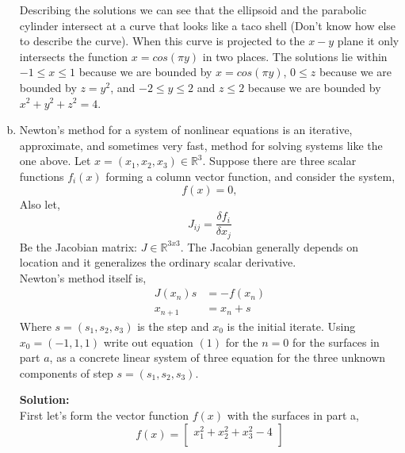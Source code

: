 \documentclass[12pt]{article}
\makeatletter
\theoremstyle{homework}
\newenvironment{exercise}[1]
{\def\@currentlabel{#1}\exercisecore}
{\endexercisecore}
\newcommand{\localhead}[1]{\par\smallskip\noindent\textbf{#1}\nobreak\\}%
\newcommand\solution{\localhead{Solution:}}
\newcommand{\Reals}{\ensuremath{\mathbb R}}
\let\RR\Reals
\makeatother
\begin{document}
\begin{exercise}{P5}
\begin{enumerate}[a.]
          \begin{center}
            
          \end{center}
          Describing the solutions we can see that the ellipsoid and the parabolic cylinder intersect at a curve that looks like a taco shell (Don't know how else to describe the curve).
          When this curve is projected to the $x-y$ plane it only intersects the function $x = cos(\pi y)$ in two places. The solutions lie within $-1\leq x \leq 1$ because we are bounded by $x = cos(\pi y)$,
          $0\leq z$ because we are bounded by $z = y^2$, and $-2\leq y \leq 2$ and $z \leq 2$ because we are bounded by $x^2 + y^2 + z^2 = 4$.
          \vspace{.15in}

    \item Newton's method for a system of nonlinear equations is an iterative, approximate, and sometimes very fast, method for solving systems like the one above. Let $x =(x_1, x_2,x_3) \in \RR^3$.
          Suppose there are three scalar functions $f_i(x)$ forming a column vector function, and consider the system,
          \begin{equation*}
            f(x) = 0,
          \end{equation*}
          Also let,
          \begin{equation*}
            J_{ij} = \dfrac{\delta f_i}{\delta x_j}
          \end{equation*}
          Be the Jacobian matrix: $J \in \RR^{3x3}$. The Jacobian generally depends on location and it generalizes the ordinary scalar derivative.\\
          Newton's method itself is,
          \begin{align}
            J(x_n)s & = -f(x_n) \\
            x_{n+1} & = x_n + s
          \end{align}
          Where $s = (s_1, s_2, s_3)$ is the step and $x_0$ is the initial iterate. Using $x_0 = (-1,1,1)$ write out equation $(1)$ for the $n = 0$ for the surfaces in part $a$,
          as a concrete linear system  of three equation for the three unknown components of step $s = (s_1,s_2,s_3)$. \\
          \solution First let's form the vector function $f(x)$ with the surfaces in part a,
          \begin{equation*}
            f(x) =
            \begin{bmatrix}
              x_1^2 +x_2^2 + x_3^2 - 4 \\

\end{bmatrix}
\end{equation*}
\end{enumerate}
\end{exercise}
\end{document}

